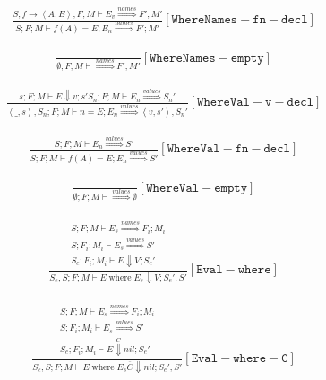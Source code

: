 \documentclass{scrartcl}
\DeclareMathOperator{\where}{where}
\begin{document}
    \begin{align*}
    \frac{
        S; f \to \left< A, E \right >, F; M \vdash E_v \overset{names}{\Rightarrow} F'; M'
    }{
        S; F; M \vdash f(A) = E; E_n \overset{names}{\Rightarrow} F'; M'
    }[\mathtt{WhereNames-fn-decl}]
    \end{align*}
    
    \begin{align*}
    \frac{}{
        \emptyset; F; M \vdash \overset{names}{\Rightarrow} F'; M'
    }[\mathtt{WhereNames-empty}]
    \end{align*}
    
    \begin{align*}
    \frac{
        s; F; M \vdash E \Downarrow v; s'
        S_n; F; M \vdash E_n \overset{values}{\Rightarrow} S_n'
    }{
        \left<\_, s\right>, S_n; F; M \vdash n = E; E_n \overset{values}{\Rightarrow} \left<v, s'\right>, S_n'
    }[\mathtt{WhereVal-v-decl}]
    \end{align*}
    
    \begin{align*}
    \frac{
        S; F; M \vdash E_n \overset{values}{\Rightarrow} S'
    }{
        S; F; M \vdash f(A) = E; E_n \overset{values}{\Rightarrow} S'
    }[\mathtt{WhereVal-fn-decl}]
    \end{align*}
    
    \begin{align*}
    \frac{}{
        \emptyset; F; M \vdash \overset{values}{\Rightarrow} \emptyset
    }[\mathtt{WhereVal-empty}]
    \end{align*}
    
    \begin{align*}
    \frac{
        \begin{matrix}
        S; F; M \vdash E_s \overset{names}{\Rightarrow} F_i; M_i \\
        S; F_i; M_i \vdash E_s \overset{values}{\Rightarrow} S' \\
        S_e; F_i; M_i \vdash E \Downarrow V; S_e'        
        \end{matrix}
    }{
        S_e, S; F; M \vdash E \where E_s \Downarrow V; S_e', S'
    }[\mathtt{Eval-where}]
    \end{align*}
    
    \begin{align*}
    \frac{
        \begin{matrix}
        S; F; M \vdash E_s \overset{names}{\Rightarrow} F_i; M_i \\
        S; F_i; M_i \vdash E_s \overset{values}{\Rightarrow} S' \\
        S_e; F_i; M_i \vdash E \overset{C}{\Downarrow} nil; S_e'        
        \end{matrix}
    }{
        S_e, S; F; M \vdash E \where E_s \overline{C}{\Downarrow} nil; S_e', S'
    }[\mathtt{Eval-where-C}]
    \end{align*}
   
\end{document}

